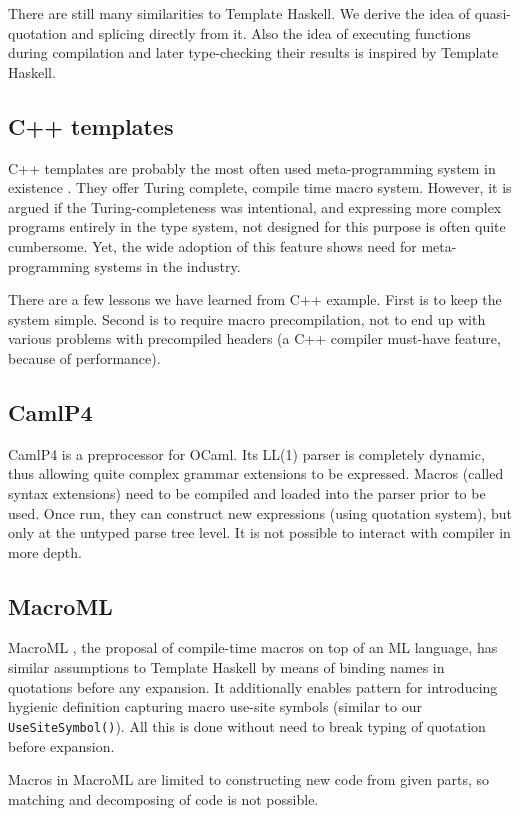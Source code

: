 \documentclass{llncs}
\begin{document}
There are still many similarities to Template Haskell. We derive the idea of quasi-quotation
and splicing directly from it. Also the idea of executing functions during compilation
and later type-checking their results is inspired by Template Haskell.

\subsection{C++ templates}
C++ templates \cite{Meta:Cpp} are probably the most often used meta-programming 
system in existence . They offer Turing complete, compile time macro system.
However, it is argued if the Turing-completeness was intentional,
and expressing more complex programs entirely in the type system,
not designed for this purpose is often quite cumbersome.
Yet, the wide adoption of this feature shows need for meta-programming
systems in the industry.

There are a few lessons we have learned from C++ example. First is to
keep the system simple. Second is to require macro precompilation,
not to end up with various problems with precompiled headers (a C++
compiler must-have feature, because of performance).

\subsection{CamlP4}
CamlP4 \cite{Camlp4} is a preprocessor for OCaml.  Its LL(1) parser is completely
dynamic, thus allowing quite complex grammar extensions to be expressed.
Macros (called syntax extensions) need to be compiled and loaded into
the parser prior to be used. Once run, they can construct new expressions
(using quotation system), but only at the untyped parse tree level.
It is not possible to interact with compiler in more depth.


\subsection{MacroML}
MacroML \cite{MacroML}, the proposal of compile-time macros on top of an ML language, 
has similar assumptions to Template Haskell by means of binding names in quotations before 
any expansion. It additionally enables pattern for introducing hygienic definition capturing
macro use-site symbols (similar to our \verb,UseSiteSymbol(),). All this is done
without need to break typing of quotation before expansion.

Macros in MacroML are limited to constructing new code from given parts, so matching
and decomposing of code is not possible.
\end{document}

